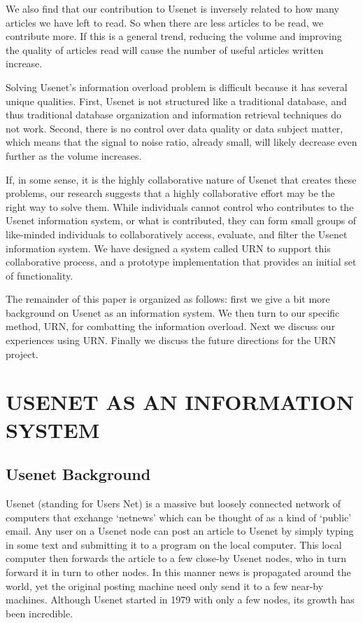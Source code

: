 We also find that our contribution to Usenet is inversely related to how
many articles we have left to read. So when there are less articles to be
read, we contribute more. If this is a general trend, reducing the volume
and improving the quality of articles read will cause the number of useful
articles written increase.
  
Solving Usenet's information overload problem is difficult because it has
several unique qualities. First, Usenet is not structured like a
traditional database, and thus traditional database organization and
information retrieval techniques do not work. Second, there is no control
over data quality or data subject matter, which means that the signal to
noise ratio, already small, will likely decrease even further as the volume
increases.
  
If, in some sense, it is the highly collaborative nature of Usenet that
creates these problems, our research suggests that a highly collaborative
effort may be the right way to solve them. While individuals cannot control
who contributes to the Usenet information system, or what is contributed,
they can form small groups of like-minded individuals to collaboratively
access, evaluate, and filter the Usenet information system.  We have
designed a system called URN to support this collaborative process, and a
prototype implementation that provides an initial set of functionality.
  
The remainder of this paper is organized as follows: first we give a bit
more background on Usenet as an information system. We then turn to our
specific method, URN, for combatting the information overload. Next we
discuss our experiences using URN. Finally we discuss the future directions
for the URN project.

\section{USENET AS AN INFORMATION SYSTEM}
\label{sec:usenet}


\subsection{Usenet Background
}
Usenet (standing for Users Net) is a massive but loosely connected network of
computers that exchange `netnews' which can be thought of as a kind of `public'
email. Any user on a Usenet node can post an article to Usenet by simply typing
in some text and submitting it to a program on the local computer. This local
computer then forwards the article to a few close-by Usenet nodes, who in turn
forward it in turn to other nodes. In this manner news is propagated around the
world, yet the original posting machine need only send it to a few near-by
machines. Although Usenet started in 1979 with only a few nodes, its growth has
been incredible.

